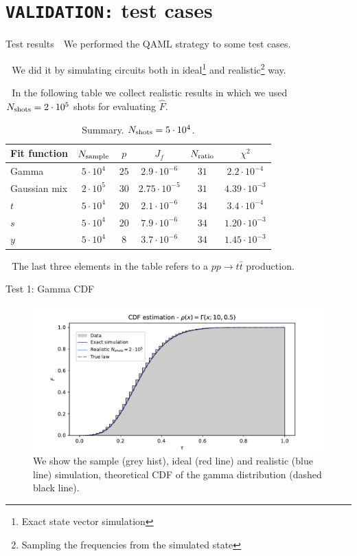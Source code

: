 \documentclass[8pt, xcolor={svgnames}, hyperref={colorlinks, linkcolor=black, citecolor=amethyst, urlcolor=amethyst}]{beamer}
\begin{document}
\section{\texttt{VALIDATION:} test cases}

\begin{frame}{Test results}
\large 
\faArrowCircleRight\,\, We performed the QAML strategy to some test cases.
\pause 

\faArrowCircleRight\,\, We did it by simulating circuits both in ideal\footnote<2->{Exact
state vector simulation} and realistic\footnote<2->{Sampling the frequencies from the
simulated state} way. 
\pause 

\faArrowCircleRight\,\, In the following table we collect realistic results in which we used 
$N_{\rm shots}=2\cdot 10^{5}$ shots for evaluating $\hat{F}$.
\begin{table}
  \begin{tabular}{lccccc}
  \hline \hline
    Fit function & $N_{\rm sample}$ & $p$ & $J_f$ & $N_{\rm ratio}$ & $\chi^2$\\
  \hline
    Gamma & $5 \cdot 10^4$ & $25$ & $2.9 \cdot 10^{-6}$ & $31$ & $2.2\cdot10^{-4}$ \\
    Gaussian mix & $2 \cdot 10^5$ & $30$ & $2.75 \cdot 10^{-5}$ & $31$ & $4.39 \cdot 10^{-3}$ \\
    $t$ & $5\cdot 10^4$ & $20$ & $2.1 \cdot 10^{-6}$ & $34$ & $3.4 \cdot 10^{-4}$ \\
    $s$ & $5\cdot 10^4$ & $20$ & $7.9 \cdot 10^{-6}$ & $34$ & $1.20 \cdot 10^{-3}$\\
    $y$ & $5\cdot 10^4$ & $8$ & $3.7 \cdot 10^{-6}$ & $34$ & $1.45 \cdot 10^{-3}$\\
  \hline \hline
  \end{tabular}
  \caption{\label{tab:summary}Summary. $N_{\rm shots} = 5 \cdot 10^4$.}
  \end{table}
\pause 
\faArrowCircleRight\,\, The last three elements in the table refers to a $pp\to t\bar{t}$
production.
\end{frame}

\begin{frame}[fragile]{Test 1: Gamma CDF}
\begin{figure}
  \centering
  \includegraphics[width=1\linewidth]{figures/CDF_Gamma_25_20_200000.pdf}
  \caption{We show the sample (grey hist), ideal (red line) and realistic 
  (blue line) simulation, theoretical CDF of the gamma distribution (dashed black
  line).}
\end{figure}
\end{frame}
\end{document}
